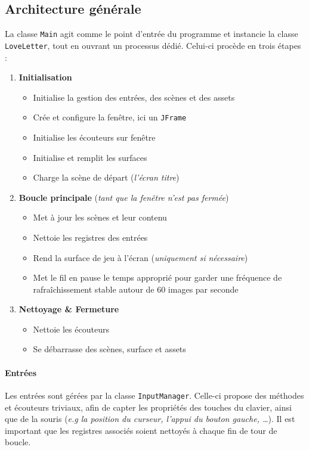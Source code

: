 \documentclass[paper=a4,fontsize=12pt,titlepage]{scrartcl}
\begin{document}
    \subsection{Architecture générale}\label{subsec:architecture-generale}

    La classe \verb|Main| agit comme le point d'entrée du programme et instancie la classe \verb|LoveLetter|, tout en
    ouvrant un processus dédié. Celui-ci procède en trois étapes :
    \begin{enumerate}
        \item \textbf{Initialisation}
        \begin{itemize}
            \item Initialise la gestion des entrées, des scènes et des assets
            \item Crée et configure la fenêtre, ici un \verb|JFrame|
            \item Initialise les écouteurs sur fenêtre
            \item Initialise et remplit les surfaces
            \item Charge la scène de départ (\textit{l'écran titre})
        \end{itemize}
        \item \textbf{Boucle principale} (\textit{tant que la fenêtre n'est pas fermée})
        \begin{itemize}
            \item Met à jour les scènes et leur contenu
            \item Nettoie les registres des entrées
            \item Rend la surface de jeu à l'écran (\textit{uniquement si nécessaire})
            \item Met le fil en pause le temps approprié pour garder une fréquence de rafraîchissement stable autour de 60 images par seconde
        \end{itemize}
        \item \textbf{Nettoyage \& Fermeture}
        \begin{itemize}
            \item Nettoie les écouteurs
            \item Se débarrasse des scènes, surface et assets
        \end{itemize}
    \end{enumerate}

    \paragraph{Entrées} Les entrées sont gérées par la classe \verb|InputManager|. Celle-ci propose des méthodes et
    écouteurs triviaux, afin de capter les propriétés des touches du clavier, ainsi que de la souris
    (\textit{e.g la position du curseur, l'appui du bouton gauche, \ldots}). Il est important que les registres associés
    soient nettoyés à chaque fin de tour de boucle.
\end{document}

